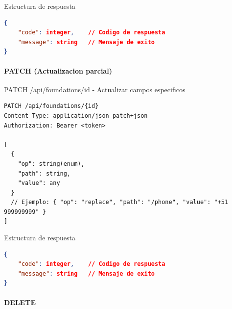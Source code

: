 \documentclass[11pt,a4paper]{article}
\begin{document}
\begin{center}
    \begin{minipage}{\textwidth}
        \begin{codebox}{Estructura de respuesta}
            \begin{lstlisting}[language=json]
{
    "code": integer,    // Codigo de respuesta
    "message": string   // Mensaje de exito
}
\end{lstlisting}
        \end{codebox}
    \end{minipage}
\end{center}

\paragraph{PATCH (Actualizacion parcial)}

\begin{center}
	\begin{minipage}{\textwidth}
		\begin{codebox}{PATCH /api/foundations/{id} - Actualizar campos especificos}
			\begin{lstlisting}[language=HTTP]
PATCH /api/foundations/{id}
Content-Type: application/json-patch+json
Authorization: Bearer <token>

[
  {
    "op": string(enum),
    "path": string,
    "value": any
  }
  // Ejemplo: { "op": "replace", "path": "/phone", "value": "+51 999999999" }
]
\end{lstlisting}
		\end{codebox}
	\end{minipage}
\end{center}

\begin{center}
    \begin{minipage}{\textwidth}
        \begin{codebox}{Estructura de respuesta}
            \begin{lstlisting}[language=json]
{
    "code": integer,    // Codigo de respuesta
    "message": string   // Mensaje de exito
}
\end{lstlisting}
        \end{codebox}
    \end{minipage}
\end{center}

\paragraph{DELETE}
\end{document}
